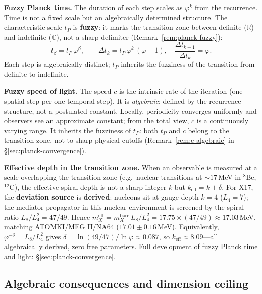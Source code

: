 \documentclass[12pt,a4paper]{article}
\begin{document}
\noindent\textbf{Fuzzy Planck time.} The duration of each step scales as $\varphi^k$ from the recurrence. Time is not a fixed scale but an algebraically determined structure. The characteristic scale $t_P$ is \textbf{fuzzy}: it marks the transition zone between definite ($\mathbb{R}$) and indefinite ($\mathbb{C}$), not a sharp delimiter (Remark~\ref{rem:planck-fuzzy}):
\begin{equation}
\boxed{t_\beta = t_P\,\varphi^\beta}, \qquad \Delta t_k = t_P\,\varphi^k\,(\varphi-1), \quad \frac{\Delta t_{k+1}}{\Delta t_k} = \varphi.
\label{eq:fuzzy-planck-time}
\end{equation}
Each step is algebraically distinct; $t_P$ inherits the fuzziness of the transition from definite to indefinite.

\medskip
\noindent\textbf{Fuzzy speed of light.} The speed $c$ is the intrinsic rate of the iteration (one spatial step per one temporal step). It is \emph{algebraic}: defined by the recurrence structure, not a postulated constant. Locally, periodicity converges uniformly and observers see an approximate constant; from the total view, $c$ is a continuously varying range. It inherits the fuzziness of $t_P$: both $t_P$ and $c$ belong to the transition zone, not to sharp physical cutoffs (Remark~\ref{rem:c-algebraic} in \S\ref{sec:planck-convergence}).

\medskip
\noindent\textbf{Effective depth in the transition zone.} When an observable is measured at a scale overlapping the transition zone (e.g.\ nuclear transitions at $\sim 17$\,MeV in $^8$Be, $^{12}$C), the effective spiral depth is not a sharp integer $k$ but $k_{\mathrm{eff}} = k + \delta$. For X17, the \textbf{deviation source} is \textbf{derived}: nucleons sit at gauge depth $k=4$ ($L_4=7$); the mediator propagator in this nuclear environment is screened by the spiral ratio $L_8/L_4^2 = 47/49$. Hence $m_X^{\mathrm{eff}} = m_X^{\mathrm{bare}}\,L_8/L_4^2 = 17.75 \times (47/49) \approx 17.03$\,MeV, matching ATOMKI/MEG II/NA64 ($17.01 \pm 0.16$\,MeV). Equivalently, $\varphi^{-\delta} = L_8/L_4^2$ gives $\delta = \ln(49/47)/\ln\varphi \approx 0.087$, so $k_{\mathrm{eff}} \approx 8.09$---all algebraically derived, zero free parameters. Full development of fuzzy Planck time and light: \S\ref{sec:planck-convergence}.

\subsection{Algebraic consequences and dimension ceiling}
\end{document}
